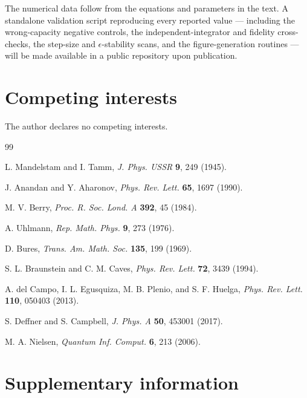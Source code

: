 \documentclass[12pt]{article}
\begin{document}
The numerical data follow from the equations and parameters in the text. A standalone validation script reproducing every reported value --- including the wrong-capacity negative controls, the independent-integrator and fidelity cross-checks, the step-size and \(\epsilon\)-stability scans, and the figure-generation routines --- will be made available in a public repository upon publication.

\section*{Competing interests}

The author declares no competing interests.

\begin{thebibliography}{99}

L. Mandelstam and I. Tamm, \textit{J. Phys. USSR} \textbf{9}, 249 (1945).

J. Anandan and Y. Aharonov, \textit{Phys. Rev. Lett.} \textbf{65}, 1697 (1990).

M. V. Berry, \textit{Proc. R. Soc. Lond. A} \textbf{392}, 45 (1984).

A. Uhlmann, \textit{Rep. Math. Phys.} \textbf{9}, 273 (1976).

D. Bures, \textit{Trans. Am. Math. Soc.} \textbf{135}, 199 (1969).

S. L. Braunstein and C. M. Caves, \textit{Phys. Rev. Lett.} \textbf{72}, 3439 (1994).

A. del Campo, I. L. Egusquiza, M. B. Plenio, and S. F. Huelga, \textit{Phys. Rev. Lett.} \textbf{110}, 050403 (2013).

S. Deffner and S. Campbell, \textit{J. Phys. A} \textbf{50}, 453001 (2017).

M. A. Nielsen, \textit{Quantum Inf. Comput.} \textbf{6}, 213 (2006).

\end{thebibliography}

\clearpage
\section*{Supplementary information}
\setcounter{figure}{0}
\renewcommand{\thefigure}{S\arabic{figure}}
\renewcommand{\theHfigure}{supp.\arabic{figure}}
\end{document}

